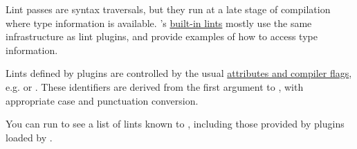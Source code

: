 Lint passes are syntax traversals, but they run at a late stage of compilation where type information is available. 
's \href{https://github.com/rust-lang/rust/blob/master/src/librustc/lint/builtin.rs}{built-in lints} mostly use 
the same infrastructure as lint plugins, and provide examples of how to access type information.

\blank

Lints defined by plugins are controlled by the usual \href{https://doc.rust-lang.org/reference.html\#lint-check-attributes}{attributes 
and compiler flags}, e.g.  or . These identifiers are derived from the first argument to 
, with appropriate case and punctuation conversion.

\blank

You can run  to see a list of lints known to , including those provided by plugins loaded 
by .
